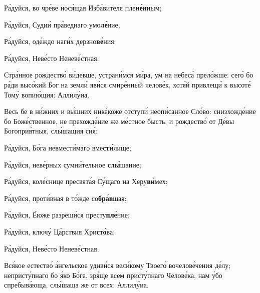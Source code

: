 \begin{russian}

  Ра́дуйся, во чре́ве нося́щая Изба́вителя пле\textbf{не́н}ным;


  Ра́дуйся, Судии́ пра́веднаго умо\textbf{ле́}ние;


  Ра́дуйся, оде́ждо наги́х дерзно\textbf{ве́}ния;


  Ра́дуйся, Неве́сто Неневе́стная.


  \Ierei Стра́нное рождество́ ви́девше, устрани́мся ми́ра, ум на небеса́ прело́жше: сего́ бо ра́ди высо́кий Бог на земли́ яви́ся смире́нный челове́к, хотя́й привлещи́ к высоте́ Тому́ вопию́щия: Аллилу́иа.


  \Ierei Весь бе в ни́жних и вы́шних ника́коже отступи́ неопи́санное Сло́во: снизхожде́ние бо Боже́ственное, не прехожде́ние же ме́стное бысть, и рождество́ от Де́вы Богоприя́тныя, слы́шащия сия́:

  Ра́дуйся, Бо́га невмести́маго вме\textbf{сти́}лище;


  Ра́дуйся, неве́рных сумни́тельное \textbf{слы́}шание;


  Ра́дуйся, коле́снице пресвята́я Су́щаго на Херу\textbf{ви́}мех;


  Ра́дуйся, проти́вная в то́жде со\textbf{бра́в}шая;


  Ра́дуйся, Е́юже разреши́ся престу\textbf{пле́}ние;


  Ра́дуйся, ключу́ Ца́рствия Хри\textbf{сто́}ва;


  Ра́дуйся, Неве́сто Неневе́стная.


  \Ierei Вся́кое естество́ а́нгельское удиви́ся вели́кому Твоего́ вочелове́чения де́лу; непристу́пнаго бо я́ко Бо́га, зря́ще всем присту́пнаго Челове́ка, нам у́бо спребыва́юща, слы́шаща же от всех: Аллилу́иа.

\end{russian}

